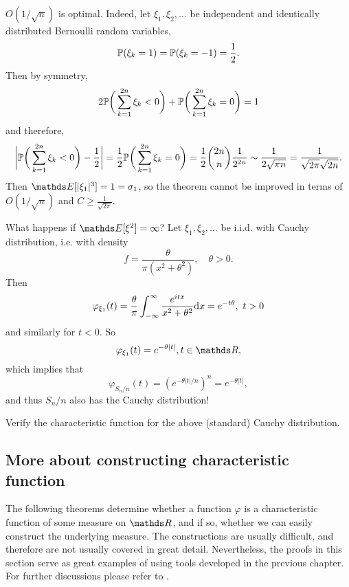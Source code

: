 \begin{remark}
$O(1/\sqrt{n})$ is optimal. Indeed, let $\xi_1, \xi_2, \dots$ be independent and identically distributed Bernoulli random variables, 
\begin{equation*}
    \mathbb{P}(\xi_k = 1) = \mathbb{P}(\xi_k = -1) = \frac12.
\end{equation*}
Then by symmetry,
\begin{equation*}
    2\mathbb{P}\bigg(\sum_{k=1}^{2n} \xi_k < 0\bigg) + \mathbb{P}\bigg(\sum_{k=1}^{2n} \xi_k = 0\bigg) = 1
\end{equation*}
and therefore,
\begin{equation*}
    \bigg|\mathbb{P}\bigg(\sum_{k=1}^{2n} \xi_k < 0\bigg) - \frac12 \bigg| = \frac12 \mathbb{P}\bigg(\sum_{k=1}^{2n} \xi_k = 0\bigg) = \frac12 \binom{2n}{n} \frac{1}{2^{2n}} \sim \frac{1}{2\sqrt{\pi n}} = \frac{1}{\sqrt{2\pi}\sqrt{2n}}.
\end{equation*}
Then $\E[|\xi_1|^3] = 1 = \sigma_1$, so the theorem cannot be improved in terms of $O(1/\sqrt{n})$ and $C \ge \frac{1}{\sqrt{2\pi}}$.
\end{remark}

\begin{example}
What happens if $\E[\xi^2] = \infty$? Let $\xi_1, \xi_2, \dots$ be i.i.d. with Cauchy distribution, i.e. with density
\begin{equation*}
    f = \frac{\theta}{\pi(x^2 + \theta^2)}, \quad \theta>0.
\end{equation*}
Then 
\begin{equation*}
    \varphi_{\xi_1}(t) = \frac{\theta}{\pi} \int_{-\infty}^\infty  \frac{e^{itx}}{x^2 + \theta^2}\mathrm{d} x = e^{-t\theta}, \, \,t>0
\end{equation*}
and similarly for $t < 0$. So
\begin{equation*}
    \varphi_{\xi_1}(t) = e^{-\theta |t|}, t \in \R,
\end{equation*}
which implies that 
\begin{equation*}
    \varphi_{S_n/n} (t) = (e^{-\theta|t|/n})^n = e^{-\theta|t|},
\end{equation*}
and thus $S_n/n$ also has the Cauchy distribution!
\end{example}

\begin{exercise}
Verify the characteristic function for the above (standard) Cauchy distribution.
\end{exercise}

\subsection{More about constructing characteristic function}
The following theorems determine whether a function $\varphi$ is a characteristic function of some measure on $\R$, and if so, whether we can easily construct the underlying measure. The constructions are usually difficult, and therefore are not usually covered in great detail. Nevertheless, the proofs in this section serve as great examples of using tools developed in the previous chapter. For further discussions please refer to \cite{characteristic_function}.


